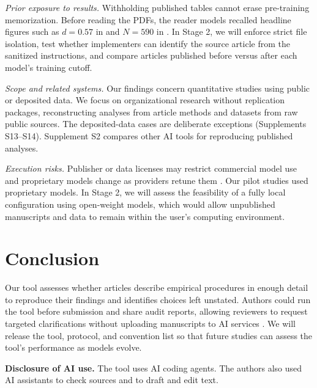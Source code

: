 \documentclass[12pt]{article}
\begin{document}
\textit{Prior exposure to results.} Withholding published tables cannot erase pre-training memorization. Before reading the PDFs, the reader models recalled headline figures such as $d = 0.57$ in \citet{twenge2010} and $N = 590$ in \citet{delaney1996}. In Stage 2, we will enforce strict file isolation, test whether implementers can identify the source article from the sanitized instructions, and compare articles published before versus after each model's training cutoff.

\textit{Scope and related systems.} Our findings concern quantitative studies using public or deposited data. We focus on organizational research without replication packages, reconstructing analyses from article methods and datasets from raw public sources. The deposited-data cases are deliberate exceptions (Supplements S13--S14). Supplement S2 compares other AI tools for reproducing published analyses.

\textit{Execution risks.} Publisher or data licenses may restrict commercial model use and proprietary models change as providers retune them \citep{bail2024}. Our pilot studies used proprietary models. In Stage 2, we will assess the feasibility of a fully local configuration using open-weight models, which would allow unpublished manuscripts and data to remain within the user's computing environment.



\section{Conclusion}\label{sec:conclusion}

Our tool assesses whether articles describe empirical procedures in enough detail to reproduce their findings and identifies choices left unstated. Authors could run the tool before submission and share audit reports, allowing reviewers to request targeted clarifications without uploading manuscripts to AI services \citep{orgsci2025ai}. We will release the tool, protocol, and convention list so that future studies can assess the tool's performance as models evolve.

\medskip
\noindent\textbf{Disclosure of AI use.} The tool uses AI coding agents. The authors also used AI assistants to check sources and to draft and edit text.



\end{document}

